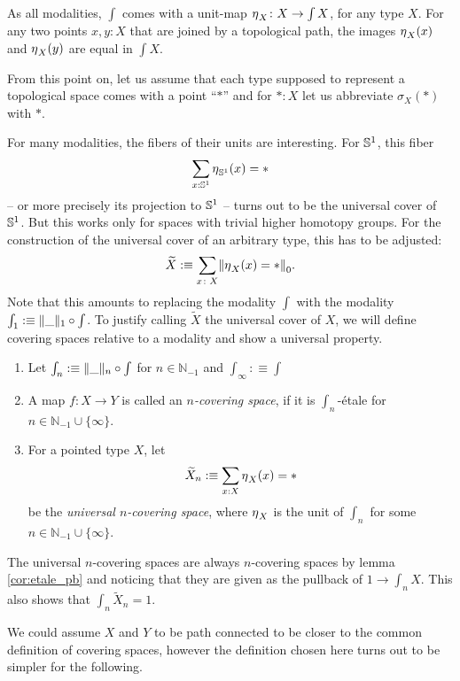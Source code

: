 \documentclass[9pt,twosided]{amsart}
\newcommand{\shape}{\int}
\newcommand{\bN}{\mathbb N}
\begin{document}
As all modalities, $\shape$ comes with a unit-map $\modalunit_X\colon X \to \shape X$, for any type $X$.
For any two points $x,y: X$ that are joined by a topological path, 
the images ${\eta_{}}_X(x)$ and ${\eta_{}}_X(y)$ are equal in $\shape X$.

From this point on, 
let us assume that each type supposed to represent a topological space comes with a point ``$\ast$''
and for $\ast:X$ let us abbreviate $\sigma_X(\ast)$ with $\ast$.
  
For many modalities, the fibers of their units are interesting.
For $\mathbb{S}^{1}$, this fiber
\[ \sum_{x:\mathbb{S}^{1}}{\eta_{}}_{\mathbb{S}^{1}}(x)=\ast \]
-- or more precisely its projection to $\mathbb{S}^{1}$ -- turns out to be the universal cover of $\mathbb{S}^{1}$.
But this works only for spaces with trivial higher homotopy groups. 
For the construction of the universal cover of an arbitrary type, this has to be adjusted:
\[ \widetilde{X}:\equiv \sum_{x\colon X} \trunc{0}{\modalunit_X(x)=\ast}. \]
Note that this amounts to replacing the modality $\shape$ with the modality $\shape_1:\equiv\trunc{1}{\_}\circ\shape$.
To justify calling $\widetilde{X}$ the universal cover of $X$, 
we will define covering spaces relative to a modality and show a universal property.

\begin{defn}
  \begin{enumerate}
  \item Let $\shape_n:\equiv\trunc{n}{\_}\circ\shape$ for $n\in\bN_{-1}$ and $\shape_\infty:\equiv\shape$
  \item A map $f:X\to Y$ is called an \emph{$n$-covering space}, if it is $\shape_n$-étale for $n\in\bN_{-1}\cup\{\infty\}$.
  \item For a pointed type $X$, let
    \[ \widetilde{X}_n:\equiv\sum_{x:X}{\eta_{}}_X(x)=\ast \]
    be the \emph{universal $n$-covering space}, where ${\eta_{}}_X$ is the unit of $\shape_n$ for some $n\in\bN_{-1}\cup\{\infty\}$.
  \end{enumerate}
\end{defn}
The universal $n$-covering spaces are always $n$-covering spaces by lemma \ref{cor:etale_pb} and noticing that they are given as the pullback of $1\to\shape_nX$.
This also shows that $\shape_n \widetilde{X}_n = 1$.

We could assume $X$ and $Y$ to be path connected to be closer to the common definition of covering spaces,
however the definition chosen here turns out to be simpler for the following.
\end{document}
